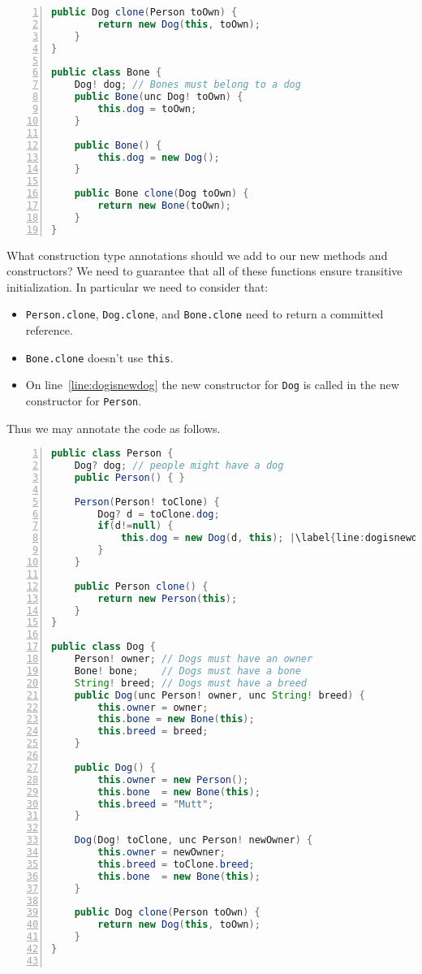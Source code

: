\documentclass{article}
\begin{document}
\begin{example}
\begin{lstlisting}[language=Java, escapechar=|, numbers=left]
    public Dog clone(Person toOwn) {
        return new Dog(this, toOwn);
    }
}

public class Bone {
    Dog! dog; // Bones must belong to a dog
    public Bone(unc Dog! toOwn) {
        this.dog = toOwn;
    }

    public Bone() {
        this.dog = new Dog();
    }

    public Bone clone(Dog toOwn) {
        return new Bone(toOwn);
    }
}
\end{lstlisting}
  What construction type annotations should we add to our new methods and constructors?
  We need to guarantee that all of these functions ensure transitive initialization.
  In particular we need to consider that:
  \begin{itemize}
  \item \texttt{Person.clone}, \texttt{Dog.clone}, and \texttt{Bone.clone} need to return a committed reference.
  \item \texttt{Bone.clone} doesn't use \texttt{this}.
  \item On line~\ref{line:dogisnewdog} the new constructor for \texttt{Dog} is called in the new constructor for \texttt{Person}.
  \end{itemize}
  Thus we may annotate the code as follows.
\begin{lstlisting}[language=Java, escapechar=|, numbers=left]
 public class Person {
    Dog? dog; // people might have a dog
    public Person() { }

    Person(Person! toClone) {
        Dog? d = toClone.dog;
        if(d!=null) {
            this.dog = new Dog(d, this); |\label{line:dogisnewdog1}|
        }
    }

    public Person clone() {
        return new Person(this);         
    }
}

public class Dog {
    Person! owner; // Dogs must have an owner
    Bone! bone;    // Dogs must have a bone
    String! breed; // Dogs must have a breed
    public Dog(unc Person! owner, unc String! breed) {
        this.owner = owner;
        this.bone = new Bone(this);
        this.breed = breed;
    }

    public Dog() {
        this.owner = new Person();
        this.bone  = new Bone(this);
        this.breed = "Mutt";
    }

    Dog(Dog! toClone, unc Person! newOwner) {
        this.owner = newOwner;
        this.breed = toClone.breed;
        this.bone  = new Bone(this);
    }

    public Dog clone(Person toOwn) {
        return new Dog(this, toOwn);
    }
}


\end{lstlisting}
\end{example}
\end{document}

